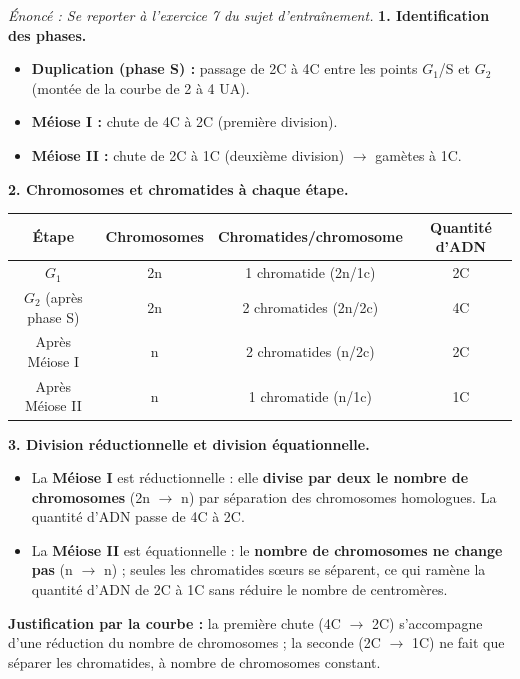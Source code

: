 \documentclass[11pt]{article}
\newcommand{\cle}[1]{{\popxbold\color{popdark}#1}}
\begin{document}
\begin{corrige}
\textit{Énoncé : Se reporter à l'exercice 7 du sujet d'entraînement.}
\tcblower
\textbf{1. Identification des phases.}
\begin{itemize}
    \item \textbf{Duplication (phase S) :} passage de 2C à 4C entre les points $G_1$/S et $G_2$ (montée de la courbe de 2 à 4 UA).
    \item \textbf{Méiose I :} chute de 4C à 2C (première division).
    \item \textbf{Méiose II :} chute de 2C à 1C (deuxième division) $\to$ gamètes à 1C.
\end{itemize}

\textbf{2. Chromosomes et chromatides à chaque étape.}
\begin{center}
\begin{tabular}{|c|c|c|c|}\hline
\textbf{Étape} & \textbf{Chromosomes} & \textbf{Chromatides/chromosome} & \textbf{Quantité d'ADN} \\ \hline
$G_1$ & 2n & 1 chromatide (2n/1c) & 2C \\ \hline
$G_2$ (après phase S) & 2n & 2 chromatides (2n/2c) & 4C \\ \hline
Après Méiose I & n & 2 chromatides (n/2c) & 2C \\ \hline
Après Méiose II & n & 1 chromatide (n/1c) & 1C \\ \hline
\end{tabular}
\end{center}

\textbf{3. Division réductionnelle et division équationnelle.}
\begin{itemize}
    \item La \textbf{Méiose I} est \cle{réductionnelle} : elle \textbf{divise par deux le nombre de chromosomes} (2n $\to$ n) par séparation des chromosomes homologues. La quantité d'ADN passe de 4C à 2C.
    \item La \textbf{Méiose II} est \cle{équationnelle} : le \textbf{nombre de chromosomes ne change pas} (n $\to$ n) ; seules les chromatides sœurs se séparent, ce qui ramène la quantité d'ADN de 2C à 1C sans réduire le nombre de centromères.
\end{itemize}
\textbf{Justification par la courbe :} la première chute (4C $\to$ 2C) s'accompagne d'une réduction du nombre de chromosomes ; la seconde (2C $\to$ 1C) ne fait que séparer les chromatides, à nombre de chromosomes constant.
\end{corrige}
\end{document}
